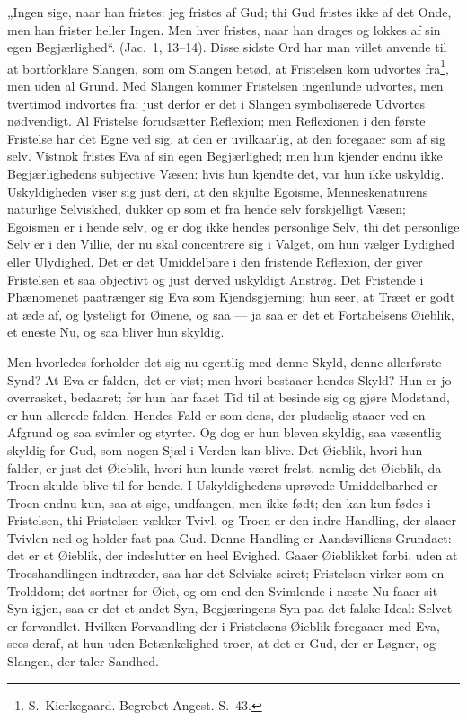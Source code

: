 \documentclass[12pt]{book}
\begin{document}
„Ingen sige, naar han fristes: jeg fristes af Gud; thi Gud fristes
ikke af det Onde, men han frister heller Ingen. Men hver fristes,
naar han drages og lokkes af sin egen Begjærlighed“. (Jac.\ 1,
13--14). Disse sidste Ord har man villet anvende til at bortforklare
Slangen, som om Slangen betød, at Fristelsen kom udvortes
fra\footnote{S.\ Kierkegaard. Begrebet Angest. S.\ 43.}, men uden
al Grund. Med Slangen kommer Fristelsen ingenlunde udvortes, men
tvertimod indvortes fra: just derfor er det i Slangen symboliserede
Udvortes nødvendigt. Al Fristelse forudsætter Reflexion; men
Reflexionen i den første Fristelse har det Egne ved sig, at den er
uvilkaarlig, at den foregaaer som af sig selv. Vistnok fristes Eva
af sin egen Begjærlighed; men hun kjender endnu ikke Begjærlighedens
subjective Væsen: hvis hun kjendte det, var hun ikke uskyldig.
Uskyldigheden viser
sig just deri, at den skjulte Egoisme, Menneskenaturens naturlige
Selviskhed, dukker op som et fra hende selv forskjelligt Væsen;
Egoismen er i hende selv, og er dog ikke hendes personlige Selv, thi
det personlige Selv er i den Villie, der nu skal concentrere sig i
Valget, om hun vælger Lydighed eller Ulydighed. Det er det
Umiddelbare i den fristende Reflexion, der giver Fristelsen et saa
objectivt og just derved uskyldigt Anstrøg. Det Fristende i
Phænomenet paatrænger sig Eva som Kjendsgjerning; hun seer, at Træet
er godt at æde af, og lysteligt for Øinene, og saa --- ja saa er det
et Fortabelsens Øieblik, et eneste Nu, og saa bliver hun skyldig.

Men hvorledes forholder det sig nu egentlig med denne Skyld, denne
allerførste Synd? At Eva er falden, det er vist; men hvori bestaaer
hendes Skyld? Hun er jo overrasket, bedaaret; før hun har faaet Tid
til at besinde sig og gjøre Modstand, er hun allerede falden. Hendes
Fald er som dens, der pludselig staaer ved en Afgrund og saa svimler
og styrter. Og dog er hun bleven skyldig, saa væsentlig skyldig for
Gud, som nogen Sjæl i Verden kan blive. Det Øieblik, hvori hun
falder, er just det Øieblik, hvori hun kunde været frelst, nemlig
det Øieblik, da Troen skulde blive til for hende. I Uskyldighedens
uprøvede Umiddelbarhed er Troen endnu kun, saa at sige, undfangen,
men ikke født; den kan kun fødes i Fristelsen, thi Fristelsen vækker
Tvivl, og Troen er den indre Handling, der slaaer Tvivlen ned og
holder fast paa Gud. Denne Handling er Aandsvilliens Grundact: det
er et Øieblik, der indeslutter en heel Evighed. Gaaer Øieblikket
forbi, uden at Troeshandlingen indtræder, saa har det Selviske
seiret; Fristelsen virker som en Trolddom; det sortner for Øiet, og
om end den Svimlende i næste Nu faaer sit Syn igjen, saa er det et
andet Syn, Begjæringens Syn paa det falske Ideal: Selvet er
forvandlet. Hvilken Forvandling der i Fristelsens Øieblik
foregaaer med Eva, sees deraf, at hun uden Betænkelighed troer, at
det er Gud, der er Løgner, og Slangen, der taler Sandhed.
\end{document}
